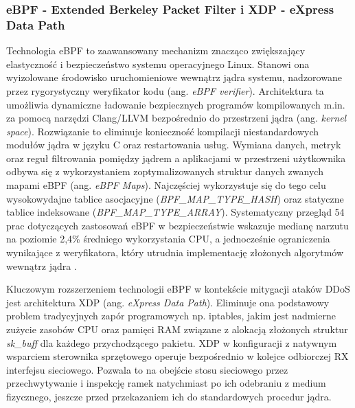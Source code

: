 \documentclass[a4paper,12pt]{article}
\begin{document}
\subsubsection{eBPF - Extended Berkeley Packet Filter i XDP - eXpress Data Path}
Technologia eBPF to zaawansowany mechanizm znacząco zwiększający elastyczność i bezpieczeństwo systemu operacyjnego Linux. Stanowi ona wyizolowane środowisko uruchomieniowe wewnątrz jądra systemu, nadzorowane przez rygorystyczny weryfikator kodu (ang. \textit{eBPF verifier}). Architektura ta umożliwia dynamiczne ładowanie bezpiecznych programów kompilowanych m.in. za pomocą narzędzi Clang/LLVM bezpośrednio do przestrzeni jądra (ang. \textit{kernel space}). Rozwiązanie to eliminuje konieczność kompilacji niestandardowych modułów jądra w języku C oraz restartowania usług. Wymiana danych, metryk oraz reguł filtrowania pomiędzy jądrem a aplikacjami w przestrzeni użytkownika odbywa się z wykorzystaniem zoptymalizowanych struktur danych zwanych mapami eBPF (ang. \textit{eBPF Maps}). Najczęściej wykorzystuje się do tego celu wysokowydajne tablice asocjacyjne (\textit{BPF\_MAP\_TYPE\_HASH}) oraz statyczne tablice indeksowane (\textit{BPF\_MAP\_TYPE\_ARRAY}). Systematyczny przegląd 54 prac dotyczących zastosowań eBPF w bezpieczeństwie wskazuje medianę narzutu na poziomie 2,4\% średniego wykorzystania CPU, a jednocześnie ograniczenia wynikające z weryfikatora, który utrudnia implementację złożonych algorytmów wewnątrz jądra \cite{kostopoulos2026ebpf}.

Kluczowym rozszerzeniem technologii eBPF w kontekście mitygacji ataków DDoS jest architektura XDP (ang. \textit{eXpress Data Path}). Eliminuje ona podstawowy problem tradycyjnych zapór programowych np. iptables, jakim jest nadmierne zużycie zasobów CPU oraz pamięci RAM związane z alokacją złożonych struktur \textit{sk\_buff} dla każdego przychodzącego pakietu. XDP w konfiguracji z natywnym wsparciem sterownika sprzętowego operuje bezpośrednio w kolejce odbiorczej RX interfejsu sieciowego. Pozwala to na obejście stosu sieciowego przez przechwytywanie i inspekcję ramek natychmiast po ich odebraniu z medium fizycznego, jeszcze przed przekazaniem ich do standardowych procedur jądra.
\end{document}
